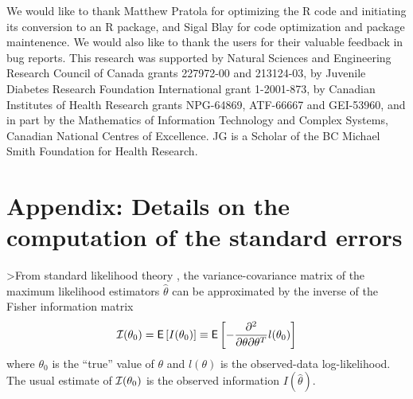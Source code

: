 \documentclass[article, shortnames]{jss}
\begin{document}
We would like to thank Matthew Pratola for optimizing the R code and 
initiating its conversion to an R package, and Sigal Blay for 
code optimization and package maintenence. We would also like to
thank the  users for their valuable feedback 
in bug reports. This research was supported
by Natural Sciences and Engineering Research Council of Canada grants
227972-00 and 213124-03,
by Juvenile Diabetes Research Foundation International grant 1-2001-873,
by Canadian Institutes of Health Research grants 
NPG-64869, ATF-66667 and GEI-53960, and in part by
the Mathematics of Information Technology and Complex Systems,
Canadian National Centres of Excellence.
JG is a Scholar of the BC Michael Smith Foundation for Health Research.

 

\section*{Appendix: Details on the computation of the standard errors}

>From standard likelihood theory
\citep[e.g.][]{McCullaghNelder83}, 
the variance-covariance
matrix of the maximum likelihood estimators $\widehat{\theta}$
can be approximated by
the inverse of the Fisher information matrix
$$ {\cal I}(\theta_0) = \mathsf{E}\left[ I(\theta_0) \right]
\equiv \mathsf{E}\left[ - \frac{\partial^2}{\partial \theta \partial \theta^T}
l(\theta_0) \right] $$
where $\theta_0$ is the ``true'' value of $\theta$ and $l(\theta)$ is
the observed-data log-likelihood. The usual estimate of
$ {\cal I}(\theta_0)$ is the observed information $I(\widehat{\theta})$.
\end{document}
